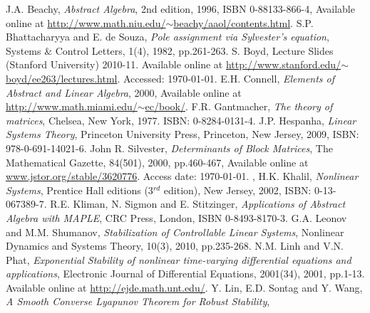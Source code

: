 \documentclass[a4paper,10pt,oneside]{book}
\begin{document}
%
%
\begin{thebibliography}{8}
      J.A. Beachy,
      \emph{Abstract Algebra}, 2nd edition, 1996, ISBN 0-88133-866-4, Available online at \href{http://www.math.niu.edu/~beachy/aaol/contents.html#index}{http://www.math.niu.edu/$\sim$beachy/aaol/contents.html}.
      S.P. Bhattacharyya and E. de Souza,
      \emph{Pole assignment via Sylvester's equation},
      Systems \& Control Letters, 1(4), 1982, pp.261-263.
      S. Boyd,	Lecture Slides (Stanford University) 2010-11. Available online at \href{http://www.stanford.edu/~boyd/ee263/lectures.html}{http://www.stanford.edu/$\sim$boyd/ee263/lectures.html}. Accessed: \today.
      E.H. Connell,
      \emph{Elements of Abstract and Linear Algebra}, 
      2000, Available online at \href{http://www.math.miami.edu/~ec/book/}{http://www.math.miami.edu/$\sim$ec/book/}.
      F.R. Gantmacher,
      \emph{The theory of matrices},
      Chelsea, New York, 1977. ISBN: 0-8284-0131-4.
      J.P. Hespanha,
      \emph{Linear Systems Theory},
      Princeton University Press, Princeton, New Jersey, 2009,
      ISBN: 978-0-691-14021-6.
      John R. Silvester,
      \emph{Determinants of Block Matrices},
      The Mathematical Gazette, 84(501), 2000, pp.460-467,
      Available online at \href{http://www.jstor.org/stable/3620776}{www.jstor.org/stable/3620776}. Access date: \today.
  ,
      H.K. Khalil, 
      \emph{Nonlinear Systems},
      Prentice Hall editions (3$^{rd}$ edition), 
      New Jersey, 2002, ISBN: 0-13-067389-7.      
      R.E. Kliman, N. Sigmon and E. Stitzinger,
      \emph{Applications of Abstract Algebra with MAPLE},
      CRC Press, London, ISBN 0-8493-8170-3.
      G.A. Leonov and M.M. Shumanov, 
      \emph{Stabilization of Controllable Linear Systems},
      Nonlinear Dynamics and Systems Theory, 10(3), 2010, pp.235-268.
      N.M. Linh and V.N. Phat,
      \emph{Exponential Stability of nonlinear time-varying differential equations and applications},
      Electronic Journal of Differential Equations, 2001(34), 2001, pp.1-13. Available online at \href{http://ejde.math.unt.edu/}{http://ejde.math.unt.edu/}.
      Y. Lin, E.D. Sontag and Y. Wang,
      \emph{A Smooth Converse Lyapunov Theorem for Robust Stability},

\end{thebibliography}
\end{document}
